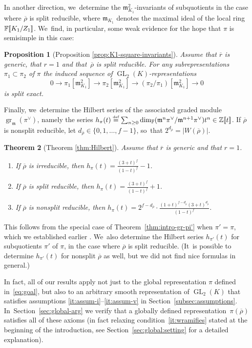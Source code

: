\documentclass[JEP,XML,SOM,Unicode,NoFloatCountersInSection, NoEqCountersInSection,published]{cedram}
\newcommand{\defeq}{\stackrel{\textrm{\tiny{\upshape{def}}}}{=}}
\newcommand{\F}{\mathbb{F}}
\newcommand{\Z}{{\mathbb Z}}
\newcommand{\fm}{\mathfrak{m}}\let\m\fm
\newcommand{\rbar}{\overline{r}}
\newcommand{\rhobar}{\overline{\rho}}
\newcommand{\brho}{\overline{\rho}}
\newcommand{\bbra}[1]{[\mkern-3mu[#1]\mkern-3mu]}
\DeclareMathOperator{\GL}{GL}
\DeclareMathOperator{\gr}{gr}
\theoremstyle{plain}
\newtheorem{prop}{Proposition}[subsection]
\newtheorem{thm}[prop]{Theorem}
\theoremstyle{definition}
\begin{document}
In another direction, we~determine the $\m_{K_1}^2$-invariants of subquotients in the case where $\brho$ is split reducible, where $\fm_{K_1}$ denotes the maximal ideal of the local ring $\F\bbra{K_1/Z_1}$. We~find, in particular, some weak evidence for the hope that $\pi$ is semisimple in this case:
\begin{prop}[Proposition \ref{prop:K1-square-invariants}]\label{prop:intro-K1-square-invariants}
Assume that $\rbar$ is generic, that $r=1$ and that~$\rhobar$ is split reducible.
For any subrepresentations $\pi_1\subset\pi_2$ of $\pi$ the induced sequence of $\GL_2(K)$-representations\vspace*{-3pt}
\[
0\to \pi_1[\m_{K_1}^2]\to \pi_2[\m_{K_1}^2]\to (\pi_2/\pi_1)[\m_{K_1}^2]\to0
\]
is split exact.
\end{prop}

Finally, we~determine the Hilbert series of the associated graded module $\gr_\m(\pi^\vee)$, namely the series $h_\pi(t) \defeq \sum_{n\geq 0} \dim_{\F}(\m^n\pi^\vee/\m^{n+1}\pi^\vee)t^n\in \Z\bbra{t}$.
If $\brho$ is nonsplit reducible, let $d_{\brho} \in \{0,1,\dots,f-1\}$, so~that $2^{d_{\brho}} = |W(\brho)|$.

\begin{thm}[Theorem \ref{thm:Hilbert}]\label{thm:intro-Hilbert}
Assume that $\rbar$ is generic and that $r=1$.
\begin{enumerate}
\item If $\brho$ is irreducible, then $\displaystyle h_{{\pi}}(t)=\frac{(3+t)^f}{(1-t)^f}-1$.
\item If $\brho$ is split reducible, then $\displaystyle h_{{\pi}}(t)=\frac{(3+t)^f}{(1-t)^f}+1$.
\item If $\brho$ is nonsplit reducible, then $\displaystyle h_{{\pi}}(t)=2^{f-d_{\brho}}\cdot \frac{(1+t)^{f-d_{\brho}}(3+t)^{d_{\brho}}}{(1-t)^f}$.
\end{enumerate}
\end{thm}

This follows from the special case of Theorem~\ref{thm:intro-gr-pi'} when $\pi' = \pi$, which we established earlier \cite[Th.\,2.1.2]{BHHMS4}. We~also determine the Hilbert series $h_{\pi'}(t)$ for subquotients $\pi'$ of $\pi$, in the case where $\brho$ is split reducible.
(It~is possible to determine $h_{\pi'}(t)$ for nonsplit $\brho$ as well, but we did not find nice formulas in general.)

In fact, all of our results apply not just to the global representation $\pi$ defined in~\eqref{eq:goal}, but also to an arbitrary smooth representation of $\GL_2(K)$ that satisfies assumptions \hbox{\eqref{it:assum-i}--\eqref{it:assum-v}} in Section~\ref{subsec:assumptions}. In~Section~\ref{sec:global-arg} we verify that a globally defined representation~$\pi(\brho)$ satisfies all of these axioms (in fact relaxing condition~\eqref{it:wramifies} stated at the beginning of the introduction, see Section~\ref{sec:global:setting} for a detailed explanation).
\end{document}
